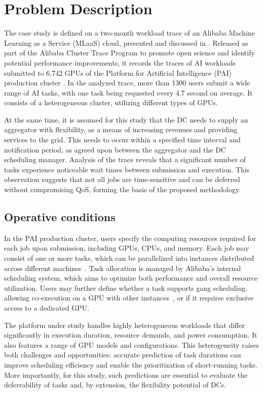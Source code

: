 \documentclass[preprint,12pt]{elsarticle}
\begin{document}
\section{Problem Description}\label{problem_description}

The case study is defined on a two-month workload trace of an Alibaba Machine Learning as a Service (MLaaS) cloud, presented and discussed in \cite{Weng2022}. Released as part of the Alibaba Cluster Trace Program \cite{alibaba2021clusterdata} to promote open science and identify potential performance improvements, it records the traces of AI workloads submitted to 6.742 GPUs of the Platform for Artificial Intelligence (PAI) production cluster \cite{alibaba2021mlplatform}. In the analyzed trace, more than 1300 users submit a wide range of AI tasks, with one task being requested every 4.7 second on average. It consists of a heterogeneous cluster, utilizing different types of GPUs. 

At the same time, it is assumed for this study that the DC needs to supply an aggregator with flexibility, as a means of increasing revenues and providing services to the grid. This needs to occur within a specified time interval and notification period, as agreed upon between the aggregator and the DC scheduling manager. Analysis of the trace reveals that a significant number of tasks experience noticeable wait times between submission and execution. This observation suggests that not all jobs are time-sensitive and can be deferred without compromising QoS, forming the basis of the proposed methodology.

\subsection{Operative conditions}

In the PAI production cluster, users specify the computing resources required for each job upon submission, including GPUs, CPUs, and memory. Each job may consist of one or more tasks, which can be parallelized into instances distributed across different machines~\cite{Weng2022}. Task allocation is managed by Alibaba’s internal scheduling system, which aims to optimize both performance and overall resource utilization. Users may further define whether a task supports gang scheduling. allowing co-execution on a GPU with other instances~\cite{antMan}, or if it requires exclusive access to a dedicated GPU.

The platform under study handles highly heterogeneous workloads that differ significantly in execution duration, resource demands, and power consumption. It also features a range of GPU models and configurations. This heterogeneity raises both challenges and opportunities: accurate prediction of task durations can improve scheduling efficiency and enable the prioritization of short-running tasks. More importantly, for this study, such predictions are essential to evaluate the deferrability of tasks and, by extension, the flexibility potential of DCs.
\end{document}
